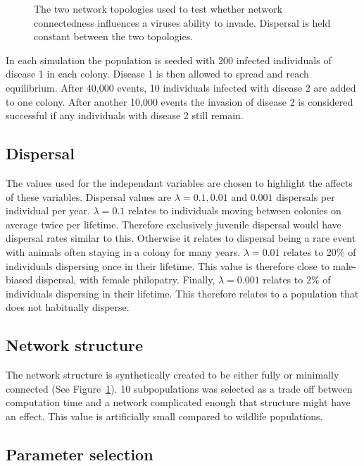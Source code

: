 \begin{figure}[t]
\caption[Network topologies used to test whether network connectedness influences pathogen invasion]{
The two network topologies used to test whether network connectedness influences a viruses ability to invade. 
Dispersal is held constant between the two topologies.
}
\label{f:net}
\end{figure}
In each simulation the population is seeded with 200 infected individuals of disease 1 in each colony. 
Disease 1 is then allowed to spread and reach equilibrium. 
After 40,000 events, 10 individuals infected with disease 2 are added to one colony. 
After another 10,000 events the invasion of disease 2 is considered successful if any individuals with disease 2 still remain.



\subsection{Dispersal}

The values used for the independant variables are chosen to highlight the affects of these variables. 
Dispersal values are $\lambda = 0.1, 0.01$ and $ 0.001$ dispersals per individual per year. 
$\lambda = 0.1$ relates to individuals moving between colonies on average twice per lifetime. 
Therefore exclusively juvenile dispersal would have dispersal rates similar to this. 
Otherwise it relates to dispersal being a rare event with animals often staying in a colony for many years.
$\lambda = 0.01$ relates to 20\% of individuals dispersing once in their lifetime.
This value is therefore close to male-biased dispersal, with female philopatry. 
Finally, $\lambda = 0.001$ relates to 2\% of individuals dispersing in their lifetime.
This therefore relates to a population that does not habitually disperse.




\subsection{Network structure}
The network structure is synthetically created to be either fully or minimally connected (See Figure~\ref{f:net}). 
10 subpopulations was selected as a trade off between computation time and a network complicated enough that structure might have an effect. 
This value is artificially small compared to wildlife populations. 



\subsection{Parameter selection}


